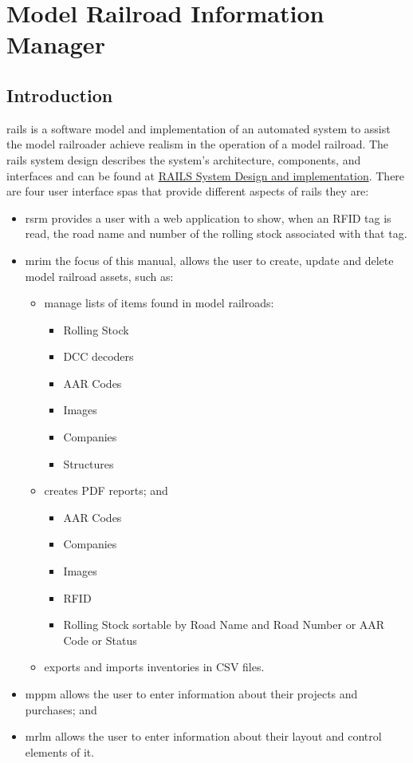 \chapter{Model Railroad Information Manager}
\section{Introduction}
\gls{rails} is a software model and implementation of an automated system to assist the model railroader achieve realism in the operation of a model railroad.
The \gls{rails} system design describes the system's architecture, components, and interfaces and can be found at \href{https://github.com/djbristow/RAILS/blob/master/Documentation/rails-system.pdf}{RAILS System Design and implementation}.
There are four user interface \glspl{spa} that provide different aspects of \gls{rails} they are:
\begin{itemize}
  \item \gls{rsrm} provides a user with a web application to show, when an RFID tag is read, the road name and number of the rolling stock associated with that tag.
  \item \gls{mrim} the focus of this manual, allows the user to create, update and delete model railroad assets, such as:
    \begin{itemize}
		\item manage lists of items found in model railroads:
        \begin{itemize}
 		    \item Rolling Stock
 		    \item DCC decoders
 		    \item AAR Codes
 		    \item Images
 		    \item Companies
 		    \item Structures
	    \end{itemize}
		\item creates PDF reports; and
        \begin{itemize}
 		    \item AAR Codes
 		    \item Companies
 		    \item Images
 		    \item RFID
 		    \item Rolling Stock sortable by Road Name and Road Number or AAR Code or Status
	    \end{itemize}
		\item exports and imports inventories in CSV files.
	\end{itemize}
  \item \gls{mppm} allows the user to enter information about their projects and purchases; and
  \item \gls{mrlm} allows the user to enter information about their layout and control elements of it.
\end{itemize}
